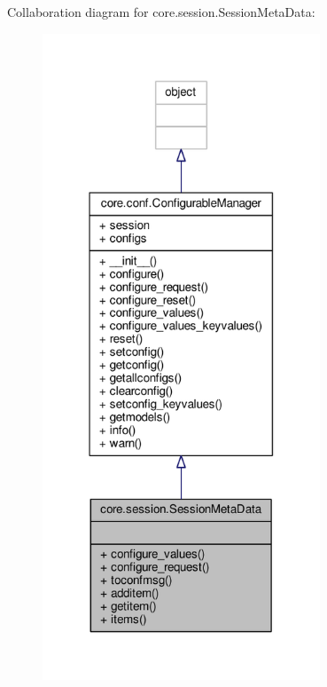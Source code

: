 Collaboration diagram for core.\+session.\+Session\+Meta\+Data\+:
\nopagebreak
\begin{figure}[H]
\begin{center}
\leavevmode
\includegraphics[width=235pt]{classcore_1_1session_1_1_session_meta_data__coll__graph}
\end{center}
\end{figure}

